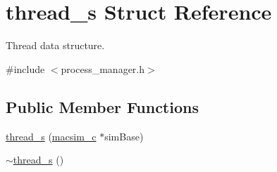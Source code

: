 \hypertarget{structthread__s}{
\section{thread\_\-s Struct Reference}
\label{structthread__s}
}


Thread data structure.  




{\ttfamily \#include $<$process\_\-manager.h$>$}

\subsection*{Public Member Functions}
\begin{DoxyCompactItemize}
\item 
\hyperlink{structthread__s_a7e7a0ede1b4c78944c41901c5a031950}{thread\_\-s} (\hyperlink{classmacsim__c}{macsim\_\-c} $\ast$simBase)
\item 
\hyperlink{structthread__s_af18191118de9e24ba2242266614d713c}{$\sim$thread\_\-s} ()
\end{DoxyCompactItemize}
